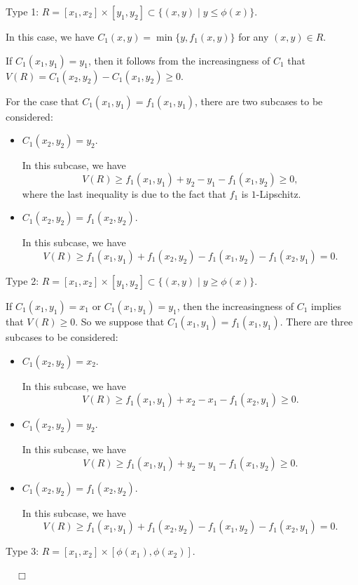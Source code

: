 \documentclass[12pt]{article}
\renewenvironment{proof}{\noindent{\bf Proof.}}{~~$\Box$}
\theoremstyle{plain}
\theoremstyle{definition}
\begin{document}
\begin{proof}
\noindent Type 1: $R=[x_1, x_2]\times[y_1, y_2]\subset\{(x, y)\mid y\leq\phi(x)\}$.

In this case, we have $C_{1}(x, y)=\min\{y, f_1(x, y)\}$ for any $(x, y)\in R$.

If $C_1(x_1, y_1)=y_1$, then it follows from the increasingness of $C_1$ that $V(R)=C_1(x_2, y_2)-C_1(x_1, y_2)\geq 0$.

For the case that $C_1(x_1, y_1)=f_1(x_1, y_1)$, there are two subcases to be considered:
\begin{itemize}%
\item[\rm (a)] $C_1(x_2, y_2)=y_2$.

In this subcase, we have
\[
V(R)\geq f_1(x_1, y_1)+y_2-y_1-f_1(x_1, y_2)\geq 0,
\]
where the last inequality is due to the fact that $f_1$ is $1$-Lipschitz.

\item[\rm (b)] $C_1(x_2, y_2)=f_1(x_2, y_2)$.

In this subcase, we have
\[
V(R)\geq f_1(x_1, y_1)+f_1(x_2, y_2)-f_1(x_1, y_2)-f_1(x_2, y_1)=0.
\]
\end{itemize}

\noindent Type 2: $R=[x_1, x_2]\times[y_1, y_2]\subset\{(x, y)\mid y\geq\phi(x)\}$.

If $C_1(x_1, y_1)=x_1$ or $C_1(x_1, y_1)=y_1$, then the increasingness of $C_1$ implies that $V(R)\geq 0$. So we suppose that
$C_1(x_1, y_1)=f_1(x_1, y_1)$. There are three subcases to be considered:
\begin{itemize}%
\item[\rm (a)] $C_1(x_2, y_2)=x_2$.

In this subcase, we have
\[
V(R)\geq f_1(x_1, y_1)+x_2-x_1-f_1(x_2, y_1)\geq 0.
\]

\item[\rm (b)] $C_1(x_2, y_2)=y_2$.

In this subcase, we have
\[
V(R)\geq f_1(x_1, y_1)+y_2-y_1-f_1(x_1, y_2)\geq 0.
\]

\item[\rm (c)] $C_1(x_2, y_2)=f_1(x_2, y_2)$.

In this subcase, we have
\[
V(R)\geq f_1(x_1, y_1)+f_1(x_2, y_2)-f_1(x_1, y_2)-f_1(x_2, y_1)=0.
\]
\end{itemize}

\noindent Type 3: $R=[x_1, x_2]\times [\phi(x_1), \phi(x_2)]$.


\end{proof}
\end{document}
